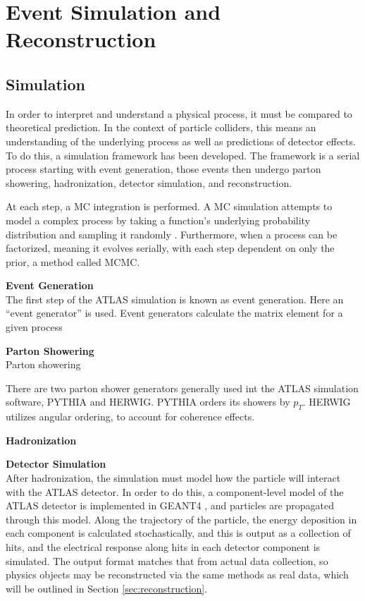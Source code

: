 \chapter{Event Simulation and Reconstruction}

\section{Simulation} \label{sec:simulation}

In order to interpret and understand a physical process, it must be compared to theoretical prediction. In the context of particle colliders, this means an understanding of the underlying process as well as predictions of detector effects. To do this, a simulation framework has been developed. The framework is a serial process starting with event generation, those events then undergo parton showering, hadronization, detector simulation, and reconstruction.

At each step, a \gls{MC} integration is performed. A \gls{MC} simulation attempts to model a complex process by taking a function's underlying probability distribution and sampling it randomly {\color{red}}. Furthermore, when a process can be factorized, meaning it evolves serially, with each step dependent on only the prior, a method called \gls{MCMC}.

\noindent\textbf{Event Generation}\\
\indent The first step of the ATLAS simulation is known as event generation. Here an ``event generator'' is used. Event generators calculate the matrix element for a given process 

\noindent\textbf{Parton Showering}\\
\indent Parton showering 

There are two parton shower generators generally used int the ATLAS simulation software, \textsc{PYTHIA} and \textsc{HERWIG}. \textsc{PYTHIA} orders its showers by $p_{T}$. \textsc{HERWIG} utilizes angular ordering, to account for coherence effects. 

\noindent\textbf{Hadronization}\\
\indent 

\noindent\textbf{Detector Simulation}\\
\indent After hadronization, the simulation must model how the particle will interact with the ATLAS detector. In order to do this, a component-level model of the ATLAS detector is implemented in \textsc{GEANT4} \cite{geant4}, and particles are propagated through this model. Along the trajectory of the particle, the energy deposition in each component is calculated stochastically, and this is output as a collection of hits, and the electrical response along hits in each detector component is simulated. The output format matches that from actual data collection, so physics objects may be reconstructed via the same methods as real data, which will be outlined in Section \ref{sec:reconstruction}.

